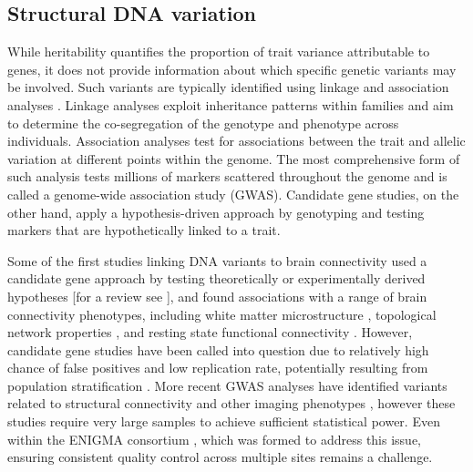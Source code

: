 \subsection{Structural DNA variation}

While heritability quantifies the proportion of trait variance attributable to genes, it does not provide information about which specific genetic variants may be involved. Such variants are typically identified using linkage and association analyses \citep{Thompson2013}. Linkage analyses exploit inheritance patterns within families and aim to determine the co-segregation of the genotype and phenotype across individuals. Association analyses test for associations between the trait and allelic variation at different points within the genome. The most comprehensive form of such analysis tests millions of markers scattered throughout the genome and is called a genome-wide association study (GWAS). Candidate gene studies, on the other hand, apply a hypothesis-driven approach by genotyping and testing markers that are hypothetically linked to a trait.

Some of the first studies linking DNA variants to brain connectivity used a candidate gene approach by testing theoretically or experimentally derived hypotheses [for a review see \citet{Thompson2013}], and found associations with a range of brain connectivity phenotypes, including white matter microstructure \citep{Braskie2012,Chiang2011,Jahanshad2012b}, topological network properties \citep{Dennis2011}, and resting state functional connectivity \citep{Filippini2009,Trachtenberg2012,Westlye2011}. However, candidate gene studies have been called into question due to relatively high chance of false positives \citep{Sullivan2007} and low replication rate, potentially resulting from population stratification \citep{Hutchison2004}. More recent GWAS analyses have identified variants related to structural connectivity \citep{Chiang2009,Jahanshad2013,Jahanshad2012a} and other imaging phenotypes \citep{Elliott2018}, however these studies require very large samples to achieve sufficient statistical power. Even within the ENIGMA consortium \citep{Thompson2014}, which was formed to address this issue, ensuring consistent quality control across multiple sites remains a challenge.


